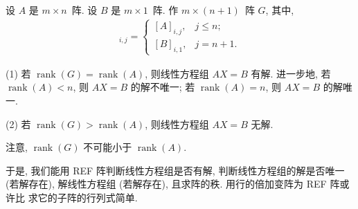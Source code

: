 \documentclass[../libro.tex]{subfiles}
\begin{document}
\begin{theorem}
    设 \(A\) 是 \(m \times n\)~阵.
    设 \(B\) 是 \(m \times 1\)~阵.
    作 \(m \times (n+1)\)~阵 \(G\),
    其中,
    \begin{align*}
        [G]_{i,j} =
        \begin{cases}
            [A]_{i,j}, & j \leq n;  \\
            [B]_{i,1}, & j = n + 1.
        \end{cases}
    \end{align*}

    (1)
    若 \(\operatorname{rank} {(G)}
    = \operatorname{rank} {(A)}\),
    则线性方程组 \(A X = B\) 有解.
    进一步地, 若 \(\operatorname{rank} {(A)} < n\),
    则 \(AX = B\) 的解不唯一;
    若 \(\operatorname{rank} {(A)} = n\),
    则 \(AX = B\) 的解唯一.

    (2)
    若 \(\operatorname{rank} {(G)}
    > \operatorname{rank} {(A)}\),
    则线性方程组 \(A X = B\) 无解.

    注意, \(\operatorname{rank} {(G)}\)
    不可能小于 \(\operatorname{rank} {(A)}\).
\end{theorem}

于是, 我们能用 REF 阵判断线性方程组是否有解,
判断线性方程组的解是否唯一 (若解存在),
解线性方程组 (若解存在),
且求阵的秩.
用行的倍加变阵为 REF 阵或许比%
求它的子阵的行列式简单.
\end{document}
